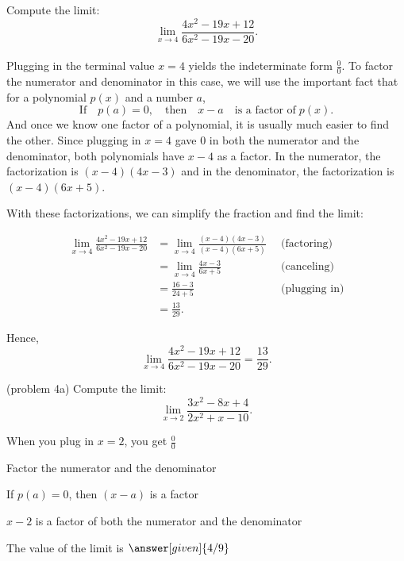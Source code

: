 \documentclass{ximera}
\begin{document}
\begin{example}[example 4]
Compute the limit: \[\lim_{x \to 4} \frac{4x^2 - 19x + 12}{6x^2 -19x -20}.\]
\\
Plugging in the terminal value $x = 4$ yields the indeterminate form $\frac00$.
To factor the numerator and denominator in this case, we will use the important fact that
for a polynomial $p(x)$ and a number $a$, 
\[\text{If} \quad p(a) = 0, \quad \text{then} \quad  x-a \quad \text{is a factor of} \; p(x).\]
And once we know one factor of a polynomial, it is usually much easier to find the other.
Since plugging in $x=4$ gave $0$ in both the numerator and the denominator, both polynomials 
have $x-4$ as a factor.
In the numerator, the factorization is $(x-4)(4x-3)$ and in the denominator, 
the factorization is $(x-4)(6x+5)$.

With these factorizations, we can simplify the fraction and find the limit:

\begin{align*}
\lim_{x \to 4} \frac{4x^2 - 19x + 12}{6x^2 -19x -20} &= \lim_{x \to 4}\frac{(x-4)(4x-3)}{(x-4)(6x + 5)} 
\enspace & \text{(factoring)} \\
&= \lim_{x \to 4} \frac{4x-3}{6x + 5} & \text{(canceling)} \\
&= \frac{16-3}{24+5} & \text{(plugging in)}\\
&= \frac{13}{29}. 
\end{align*}

Hence,
\[\lim_{x \to 4} \frac{4x^2 -19x +12}{6x^2 -19x -20} = \frac{13}{29}.\]
\end{example}



\begin{problem}(problem 4a)
  Compute the limit:
  \[
  \lim_{x \to 2} \frac{3x^2 -8x + 4}{2x^2 + x - 10}.
  \]
  
    \begin{hint}
      When you plug in $x = 2$, you get $\frac00$
    \end{hint}
    \begin{hint}
      Factor the numerator and the denominator
    \end{hint}
    \begin{hint}
      If $p(a) = 0$, then $(x-a)$ is a factor
    \end{hint}
    \begin{hint}
      $x-2$ is a factor of both the numerator and the denominator
    \end{hint}
    
		The value of the limit is
		 $\answer[given]{4/9}$
		
\end{problem}
\end{document}
